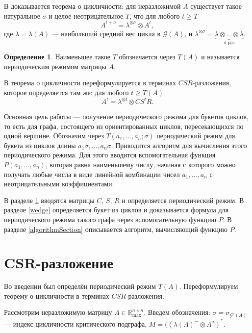 \documentclass[12pt]{article}
\theoremstyle{definition}
\newtheorem{definition}[theorem]{Определение}
\begin{document}
В \cite[теорема 3.9]{maxPlusAtWork} доказывается теорема о цикличности: для неразложимой $A$ существует такое натуральное $\sigma$ и целое неотрицательное $T$, что для любого $t \ge T$\begin{equation*}
A^{t + \sigma} = \lambda^{\otimes \sigma} \otimes A^t,
\end{equation*}
где $\lambda = \lambda(A)$ --- наибольший средний вес цикла в $\mathcal{G}(A)$, и $\lambda^{\otimes \sigma} = \underbrace{\lambda \otimes \dots \otimes \lambda}_{\sigma \text{ раз}}$.

\begin{definition}
Наименьшее такое $T$ обозначается через $T(A)$ и называется периодическим режимом матрицы $A$.
\end{definition}

В \cite{maxAlgebraicPowers} теорема о цикличности переформулируется в терминах $CSR$-разложения, которое определяется там же: для любого $t \ge T(A)$\begin{equation*}
A^t = \lambda^{\otimes t} \otimes CS^tR.
\end{equation*}

Основная цель работы --- получение периодического режима для букетов циклов, то есть для графа, состоящего из ориентированных циклов, пересекающихся по одной вершине. Обозначим через $T(a_1, \dots, a_n; \sigma)$ периодический режим для букета из циклов длины $a_1\sigma, \dots, a_n\sigma$. Приводится алгоритм для вычисления этого периодического режима. Для этого вводится вспомогательная функция $P(a_1, \dots, a_n)$, которая равна наименьшему числу, начиная с которого можно получать любые числа в виде линейной комбинации чисел $a_1, \dots, a_n$ с неотрицательными коэффициентами.

В разделе \ref{CSR} вводятся матрицы $C$, $S$, $R$ и определяется периодический режим. В разделе \ref{wedge} определяется букет из циклов и доказывается формула для периодического режима такого графа через вспомогательную функцию $P$. В разделе \ref{algorithmSection} описывается алгоритм, вычисляющий функцию $P$.

\section{CSR-разложение}
\label{CSR}
Во введении был определён периодический режим $T(A)$. Переформулируем теорему о цикличности в терминах $CSR$-разложения.

Рассмотрим неразложимую матрицу $A \in \mathbb{R}_{\max}^{n \times n}$. Введем обозначения: $\sigma = \sigma_{\mathcal{G}^c(A)}$ --- индекс цикличности критического подграфа, $M = ((\lambda(A)^-\otimes A^\sigma)^*$.
\end{document}
